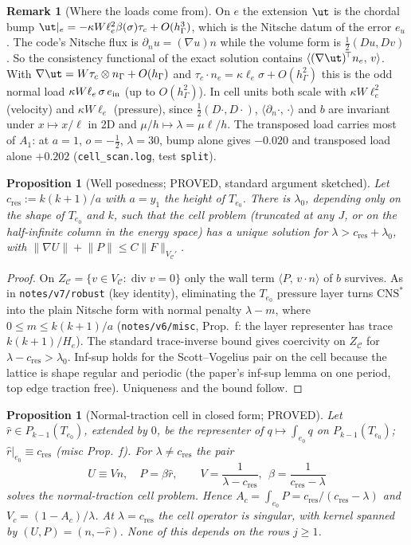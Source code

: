 \documentclass[11pt,reqno]{amsart}
\theoremstyle{plain}
\newtheorem{proposition}[theorem]{Proposition}
\theoremstyle{definition}
\newtheorem{remark}[theorem]{Remark}
\newcommand{\hG}{h_\Gamma}
\newcommand{\ip}[2]{\langle #1,\, #2\rangle}
\newcommand{\norm}[1]{\lVert #1\rVert}
\newcommand{\CNS}{\mathrm{CNS}^\ast}
\renewcommand{\div}{\operatorname{div}}
\newcommand{\Cc}{\mathcal C}
\newcommand{\cc}{c_{\mathrm{res}}}
\begin{document}
\begin{remark}[Where the loads come from]\label{rem:loads}
On $e$ the extension $\ut$ is the chordal bump $\ut|_e=-\kappa W\ell_e^2\beta(\sigma)\tau_c+O(\hG^3)$, which is the Nitsche datum of the error $e_u$. The code's Nitsche flux is $\partial_nu=(\nabla u)n$ while the volume form is $\frac12(D u,Dv)$. So the consistency functional of the exact solution contains $\ip{(\nabla\ut)^{\!\top}n_e}v$. With $\nabla\ut=W\tau_c\otimes n_\Gamma+O(\hG)$ and $\tau_c\cdot n_e=\kappa\ell_e\sigma+O(\hG^2)$ this is the odd normal load $\kappa W\ell_e\,\sigma\,e_{\rm in}$ (up to $O(\hG^2)$). In cell units both scale with $\kappa W\ell_e^2$ (velocity) and $\kappa W\ell_e$ (pressure), since $\frac12(D\cdot,D\cdot)$, $\ip{\partial_n\cdot}{\cdot}$ and $b$ are invariant under $x\mapsto x/\ell$ in 2D and $\mu/h\mapsto\lambda=\mu\ell/h$. The transposed load carries most of $A_1$: at $a=1$, $o=-\frac12$, $\lambda=30$, bump alone gives $-0.020$ and transposed load alone $+0.202$ (\texttt{cell\_scan.log}, test \texttt{split}).
\end{remark}

\begin{proposition}[Well posedness; PROVED, standard argument sketched]\label{prop:wp}
Let $\cc:=k(k+1)/a$ with $a=y_1$ the height of $T_{e_0}$. There is $\lambda_0$, depending only on the shape of $T_{e_0}$ and $k$, such that the cell problem (truncated at any $J$, or on the half-infinite column in the energy space) has a unique solution for $\lambda>\cc+\lambda_0$, with $\norm{\nabla U}+\norm P\le C\norm F_{V_\Cc'}$.
\end{proposition}

\begin{proof}
On $Z_\Cc=\{v\in V_\Cc:\div v=0\}$ only the wall term $\ip P{v\cdot n}$ of $b$ survives. As in \texttt{notes/v7/robust} (key identity), eliminating the $T_{e_0}$ pressure layer turns $\CNS$ into the plain Nitsche form with normal penalty $\lambda-m$, where $0\le m\le k(k+1)/a$ (\texttt{notes/v6/misc}, Prop.~f: the layer representer has trace $k(k+1)/H_e$). The standard trace-inverse bound gives coercivity on $Z_\Cc$ for $\lambda-\cc>\lambda_0$. Inf-sup holds for the Scott--Vogelius pair on the cell because the lattice is shape regular and periodic (the paper's inf-sup lemma on one period, top edge traction free). Uniqueness and the bound follow.
\end{proof}

\begin{proposition}[Normal-traction cell in closed form; PROVED]\label{prop:trac}
Let $\hat r\in P_{k-1}(T_{e_0})$, extended by $0$, be the representer of $q\mapsto\int_{e_0}q$ on $P_{k-1}(T_{e_0})$; $\hat r|_{e_0}\equiv\cc$ (misc Prop.~f). For $\lambda\ne\cc$ the pair
\[
U\equiv Vn,\quad P=\beta\hat r,\qquad V=\frac1{\lambda-\cc},\ \ \beta=\frac1{\cc-\lambda}
\]
solves the normal-traction cell problem. Hence $A_c=\int_{e_0}P=\cc/(\cc-\lambda)$ and $V_c=(1-A_c)/\lambda$. At $\lambda=\cc$ the cell operator is singular, with kernel spanned by $(U,P)=(n,-\hat r)$. None of this depends on the rows $j\ge1$.
\end{proposition}
\end{document}
